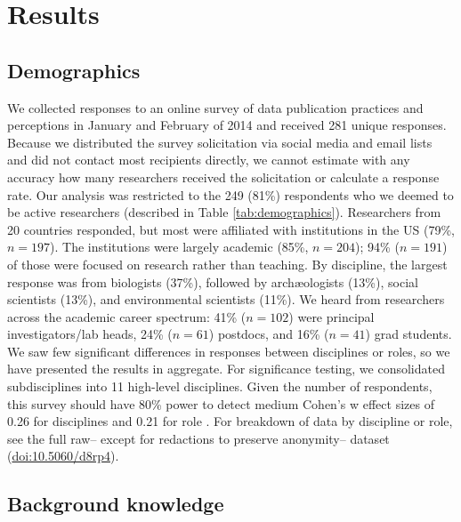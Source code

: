 \documentclass[10pt]{article}
\begin{document}
\section*{Results}

\subsection*{Demographics}

We collected responses to an online survey of data publication practices and perceptions in January and February of 2014 and received 281 unique responses.
Because we distributed the survey solicitation via social media and email lists and did not contact most recipients directly, we cannot estimate with any accuracy how many researchers received the solicitation or calculate a response rate.
Our analysis was restricted to the 249 (81\%) respondents who we deemed to be active researchers (described in Table \ref{tab:demographics}).
Researchers from 20 countries responded, but most were affiliated with institutions in the US (79\%, $n=197$).
The institutions were largely academic (85\%, $n=204$); 94\% ($n=191$) of those were focused on research rather than teaching. 
By discipline, the largest response was from biologists (37\%), followed by arch{\ae}ologists (13\%), social scientists (13\%), and environmental scientists (11\%).
We heard from researchers across the academic career spectrum: 41\% ($n=102$) were principal investigators/lab heads, 24\% ($n=61$) postdocs, and 16\% ($n=41$) grad students.
We saw few significant differences in responses between disciplines or roles, so we have presented the results in aggregate.
For significance testing, we consolidated subdisciplines into 11 high-level disciplines.
Given the number of respondents, this survey should have 80\% power to detect medium Cohen's w effect sizes of 0.26 for disciplines and 0.21 for role \cite{cohen_statistical_1988}.
For breakdown of data by discipline or role, see the full raw-- except for redactions to preserve anonymity-- dataset (\href{https://dash.ucop.edu/xtf/view?docId=ucop/ark%2B%3Db5060%3Dd8rp4v/mrt-datacite.xml}{doi:10.5060/d8rp4}).

\subsection*{Background knowledge}
\end{document}
